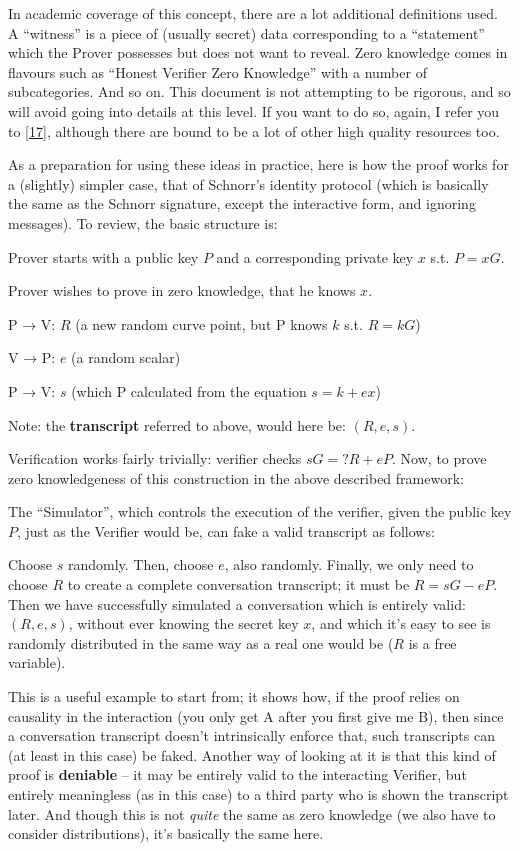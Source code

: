 \documentclass[10pt,a4paper]{article}
\begin{document}
In academic coverage of this concept, there are a lot additional
definitions used. A ``witness'' is a piece of (usually secret) data
corresponding to a ``statement'' which the Prover possesses but does not
want to reveal. Zero knowledge comes in flavours such as ``Honest
Verifier Zero Knowledge'' with a number of subcategories. And so on.
This document is not attempting to be rigorous, and so will avoid going
into details at this level. If you want to do so, again, I refer you to
{[}\protect\hyperlink{anchor-27}{17}{]}, although there are bound to be
a lot of other high quality resources too.

As a preparation for using these ideas in practice, here is how the
proof works for a (slightly) simpler case, that of Schnorr's identity
protocol (which is basically the same as the Schnorr signature, except
the interactive form, and ignoring messages). To review, the basic
structure is:

Prover starts with a public key $P$ and a corresponding private key $x$ s.t. $P=xG$.

Prover wishes to prove in zero knowledge, that he knows $x$.

P → V: $R$ (a new random curve point, but P knows $k$ s.t. $R=kG$)

V → P: $e$ (a random scalar)

P → V: $s$ (which P calculated from the equation $s=k+ex$)

Note: the \textbf{transcript} referred to above, would here be: $(R, e, s)$.

Verification works fairly trivially: verifier checks $sG =? R + eP$. Now, to prove
zero knowledgeness of this construction in the above described
framework:

The ``Simulator'', which controls the execution of the verifier, given
the public key $P$, just as the Verifier would be, can fake a valid
transcript as follows:

Choose $s$ randomly. Then, choose $e$, also randomly. Finally, we only need to
choose $R$ to create a complete conversation transcript; it must be $R = sG -eP$. Then
we have successfully simulated a conversation which is entirely valid: $(R, e, s)$,
without ever knowing the secret key $x$, and which it's easy to see is
randomly distributed in the same way as a real one would be ($R$ is a free
variable).

This is a useful example to start from; it shows how, if the proof
relies on causality in the interaction (you only get A after you first
give me B), then since a conversation transcript doesn't intrinsically
enforce that, such transcripts can (at least in this case) be faked.
Another way of looking at it is that this kind of proof is
\textbf{deniable} -- it may be entirely valid to the interacting
Verifier, but entirely meaningless (as in this case) to a third party
who is shown the transcript later. And though this is not \emph{quite}
the same as zero knowledge (we also have to consider distributions),
it's basically the same here.
\end{document}
